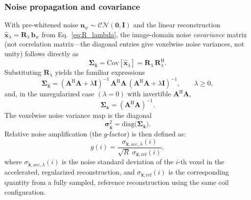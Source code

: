 \documentclass[AMA,STIX2COL,Linenumberson]{MRM}
\begin{document}
\subsubsection{Noise propagation and covariance}

With pre-whitened noise \(\mathbf{n}_w\sim\mathcal{CN}(\mathbf{0},\mathbf{I})\) and the linear reconstruction \(\hat{\mathbf{x}}_\lambda=\mathbf{R}_\lambda\,\mathbf{b}_w\) from Eq.~\eqref{eq:R_lambda}, the image-domain noise \emph{covariance} matrix (not correlation matrix---the diagonal entries give voxelwise noise variances, not unity) follows directly as
\begin{equation}
\boldsymbol{\Sigma}_{\hat{\mathbf{x}}}
=\mathrm{Cov}[\hat{\mathbf{x}}_\lambda]
=\mathbf{R}_\lambda\,\mathbf{R}_\lambda^{\mathrm{H}}.
\label{eq:cov_general_theory}
\end{equation}
Substituting \(\mathbf{R}_\lambda\) yields the familiar expressions
\begin{equation}
\boldsymbol{\Sigma}_{\hat{\mathbf{x}}}
=(\mathbf{A}^{\mathrm{H}}\mathbf{A}+\lambda\mathbf{I})^{-1}\,\mathbf{A}^{\mathrm{H}}\mathbf{A}\,(\mathbf{A}^{\mathrm{H}}\mathbf{A}+\lambda\mathbf{I})^{-1},
\qquad \lambda\ge 0,
\label{eq:cov_tikh_theory}
\end{equation}
and, in the unregularized case \((\lambda=0)\) with invertible \(\mathbf{A}^{\mathrm{H}}\mathbf{A}\),
\begin{equation}
\boldsymbol{\Sigma}_{\hat{\mathbf{x}}}=(\mathbf{A}^{\mathrm{H}}\mathbf{A})^{-1}.
\label{eq:cov_ls_theory}
\end{equation}
The voxelwise noise variance map is the diagonal \cite{sense,Breuer2009}
\begin{equation}
\boldsymbol{\sigma}^2_{\hat{\mathbf{x}}}=\mathrm{diag}\!\big(\boldsymbol{\Sigma}_{\hat{\mathbf{x}}}\big).
\label{eq:varmap_theory}
\end{equation}
Relative noise amplification (the \(g\)-factor) is then defined as:
\begin{equation}
g(i)=\frac{\sigma_{\hat{\mathbf{x}},\mathrm{acc},\lambda}(i)}
  {\sqrt{R}\;\sigma_{\hat{\mathbf{x}},\mathrm{ref}}(i)},
\label{eq:g_factor_def}
\end{equation}
where $\sigma_{\hat{\mathbf{x}},\mathrm{acc},\lambda}(i)$ is the 
noise standard deviation of the $i$-th voxel in the accelerated, 
regularized reconstruction, and 
$\sigma_{\hat{\mathbf{x}},\mathrm{ref}}(i)$ is the corresponding 
quantity from a fully sampled, reference reconstruction using the same coil configuration.
\end{document}
